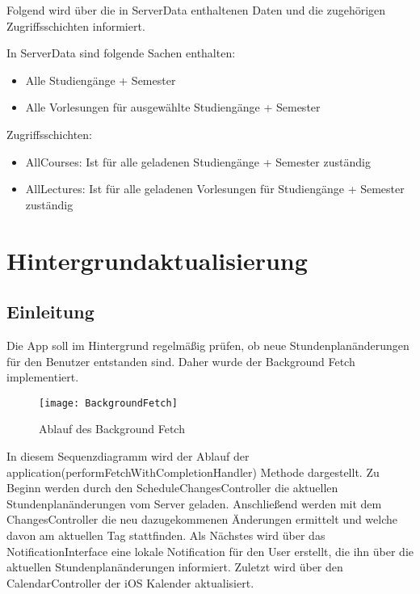 Folgend wird über die in ServerData enthaltenen Daten und die zugehörigen Zugriffsschichten informiert.

In ServerData sind folgende Sachen enthalten:
\begin{itemize}
     \item Alle Studiengänge + Semester
     \item Alle Vorlesungen für ausgewählte Studiengänge + Semester \\     
\end{itemize}

Zugriffsschichten: 
\begin{itemize}
     \item AllCourses: Ist für alle geladenen Studiengänge + Semester zuständig
     \item AllLectures: Ist für alle geladenen Vorlesungen für Studiengänge + Semester zuständig\\
\end{itemize}

\newpage
\chapter{Hintergrundaktualisierung}
\section{Einleitung}
Die App soll im Hintergrund regelmäßig prüfen, ob neue Stundenplanänderungen für den Benutzer entstanden sind.
Daher wurde der Background Fetch implementiert.
\begin{figure}[htb]
    \centering
    \texttt{[image: BackgroundFetch]}
    \caption{Ablauf des Background Fetch}
\end{figure}

In diesem Sequenzdiagramm wird der Ablauf der application(performFetchWithCompletionHandler) Methode dargestellt. 
Zu Beginn werden durch den ScheduleChangesController die aktuellen Stundenplanänderungen vom Server geladen. 
Anschließend werden mit dem ChangesController die neu dazugekommenen Änderungen ermittelt und welche davon am aktuellen Tag stattfinden. Als Nächstes wird über das NotificationInterface eine lokale Notification für den User erstellt, die ihn über die aktuellen Stundenplanänderungen informiert.
Zuletzt wird über den CalendarController der iOS Kalender aktualisiert.
